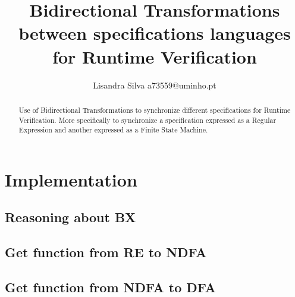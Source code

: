 \documentclass[runningheads]{llncs}
\begin{document}
	\title{Bidirectional Transformations between specifications languages for Runtime Verification}
	\author{Lisandra Silva a73559@uminho.pt}
	\maketitle              %
	
	\begin{abstract}
		Use of Bidirectional Transformations to synchronize different specifications for Runtime Verification. More specifically to synchronize a specification expressed as a Regular Expression and another expressed as a Finite State Machine.
	
	\end{abstract}
	

	\par
	
    
	
    
	
    
	
	\section{Implementation}
	\subsection{Reasoning about BX}
	
	\subsection{Get function from RE to NDFA}
	
	\subsection{Get function from NDFA to DFA}
	
\end{document}
